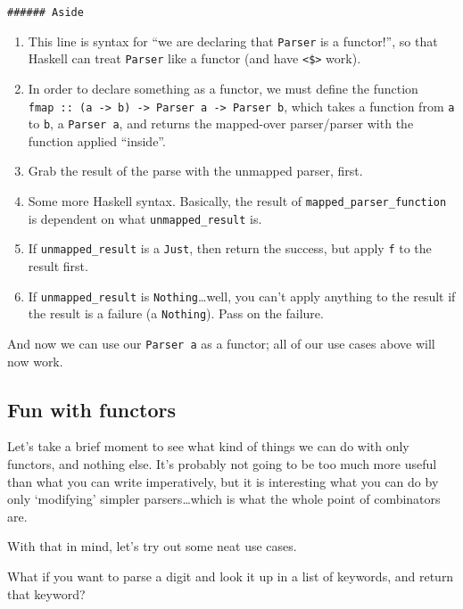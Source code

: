 \documentclass[]{article}
\begin{document}
\begin{verbatim}
###### Aside
\end{verbatim}

\begin{enumerate}
\def\labelenumi{\arabic{enumi}.}
\tightlist
\item
  This line is syntax for ``we are declaring that \texttt{Parser} is a
  functor!'', so that Haskell can treat \texttt{Parser} like a functor
  (and have \texttt{\textless{}\$\textgreater{}} work).
\item
  In order to declare something as a functor, we must define the
  function
  \texttt{fmap\ ::\ (a\ -\textgreater{}\ b)\ -\textgreater{}\ Parser\ a\ -\textgreater{}\ Parser\ b},
  which takes a function from \texttt{a} to \texttt{b}, a
  \texttt{Parser\ a}, and returns the mapped-over parser/parser with the
  function applied ``inside''.
\item
  Grab the result of the parse with the unmapped parser, first.
\item
  Some more Haskell syntax. Basically, the result of
  \texttt{mapped\_parser\_function} is dependent on what
  \texttt{unmapped\_result} is.
\item
  If \texttt{unmapped\_result} is a \texttt{Just}, then return the
  success, but apply \texttt{f} to the result first.
\item
  If \texttt{unmapped\_result} is \texttt{Nothing}\ldots{}well, you
  can't apply anything to the result if the result is a failure (a
  \texttt{Nothing}). Pass on the failure.
\end{enumerate}

And now we can use our \texttt{Parser\ a} as a functor; all of our use
cases above will now work.

\subsection{Fun with functors}\label{fun-with-functors}

Let's take a brief moment to see what kind of things we can do with only
functors, and nothing else. It's probably not going to be too much more
useful than what you can write imperatively, but it is interesting what
you can do by only `modifying' simpler parsers\ldots{}which is what the
whole point of combinators are.

With that in mind, let's try out some neat use cases.

What if you want to parse a digit and look it up in a list of keywords,
and return that keyword?
\end{document}
